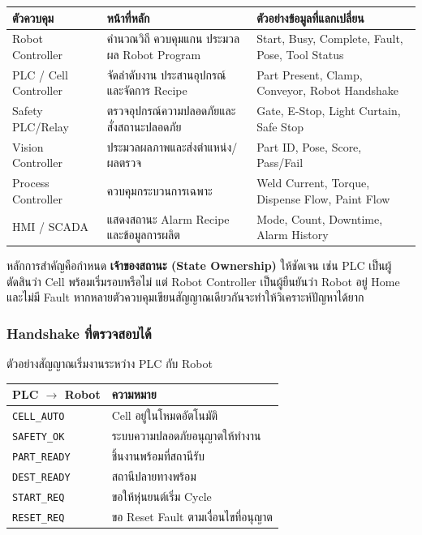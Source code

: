 \begin{table}[htbp]
    \centering
    \small
    \begin{tabularx}{\textwidth}{L{0.22\textwidth} Y Y}
        \hline
        \textbf{ตัวควบคุม} & \textbf{หน้าที่หลัก} & \textbf{ตัวอย่างข้อมูลที่แลกเปลี่ยน} \\
        \hline
        Robot Controller & คำนวณวิถี ควบคุมแกน ประมวลผล Robot Program & Start, Busy, Complete, Fault, Pose, Tool Status \\
        PLC / Cell Controller & จัดลำดับงาน ประสานอุปกรณ์ และจัดการ Recipe & Part Present, Clamp, Conveyor, Robot Handshake \\
        Safety PLC/Relay & ตรวจอุปกรณ์ความปลอดภัยและสั่งสถานะปลอดภัย & Gate, E-Stop, Light Curtain, Safe Stop \\
        Vision Controller & ประมวลผลภาพและส่งตำแหน่ง/ผลตรวจ & Part ID, Pose, Score, Pass/Fail \\
        Process Controller & ควบคุมกระบวนการเฉพาะ & Weld Current, Torque, Dispense Flow, Paint Flow \\
        HMI / SCADA & แสดงสถานะ Alarm Recipe และข้อมูลการผลิต & Mode, Count, Downtime, Alarm History \\
        \hline
    \end{tabularx}
\end{table}

หลักการสำคัญคือกำหนด \textbf{เจ้าของสถานะ (State Ownership)} ให้ชัดเจน เช่น PLC เป็นผู้ตัดสินว่า Cell พร้อมเริ่มรอบหรือไม่ แต่ Robot Controller เป็นผู้ยืนยันว่า Robot อยู่ Home และไม่มี Fault หากหลายตัวควบคุมเขียนสัญญาณเดียวกันจะทำให้วิเคราะห์ปัญหาได้ยาก

\subsubsection{Handshake ที่ตรวจสอบได้}

ตัวอย่างสัญญาณเริ่มงานระหว่าง PLC กับ Robot

\begin{table}[htbp]
    \centering
    \small
    \begin{tabularx}{\textwidth}{L{0.16\textwidth} Y}
        \hline
        \textbf{PLC \(\rightarrow\) Robot} & \textbf{ความหมาย} \\
        \hline
        \texttt{CELL\_AUTO} & Cell อยู่ในโหมดอัตโนมัติ \\
        \texttt{SAFETY\_OK} & ระบบความปลอดภัยอนุญาตให้ทำงาน \\
        \texttt{PART\_READY} & ชิ้นงานพร้อมที่สถานีรับ \\
        \texttt{DEST\_READY} & สถานีปลายทางพร้อม \\
        \texttt{START\_REQ} & ขอให้หุ่นยนต์เริ่ม Cycle \\
        \texttt{RESET\_REQ} & ขอ Reset Fault ตามเงื่อนไขที่อนุญาต \\
        \hline
    \end{tabularx}
\end{table}

